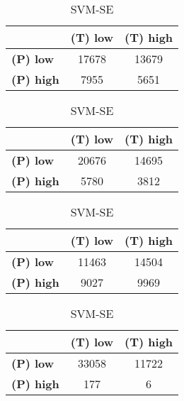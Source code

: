 \begin{landscape}
\begin{table}[htbp]
\centering
\caption{PCA_HoE__A SEX}
\begin{minipage}{.3\textwidth}
\tiny
\caption*{SVM-AP}
\begin{tabular}{|l|c|c|}
\hline
					& \textbf{(T) low}	& \textbf{(T) high}	\\ \hline
\textbf{(P) low}	& 17678				& 13679				\\ \hline
\textbf{(P) high}	& 7955				& 5651				\\ \hline
\end{tabular}
\end{minipage}\hfill
\begin{minipage}{.3\textwidth}
\tiny
\caption*{SVM-AT}
\begin{tabular}{|l|c|c|}
\hline
					& \textbf{(T) low}	& \textbf{(T) high}	\\ \hline
\textbf{(P) low}	& 20676				& 14695				\\ \hline
\textbf{(P) high}	& 5780				& 3812				\\ \hline
\end{tabular}
\end{minipage}\hfill
\begin{minipage}{.3\textwidth}
\tiny
\caption*{SVM-PL}
\begin{tabular}{|l|c|c|}
\hline
					& \textbf{(T) low}	& \textbf{(T) high}	\\ \hline
\textbf{(P) low}	& 11463				& 14504				\\ \hline
\textbf{(P) high}	& 9027				& 9969				\\ \hline
\end{tabular}
\end{minipage}\hfill
\begin{minipage}{.3\textwidth}
\tiny
\caption*{SVM-SE}
\begin{tabular}{|l|c|c|}
\hline
					& \textbf{(T) low}	& \textbf{(T) high}	\\ \hline
\textbf{(P) low}	& 33058				& 11722				\\ \hline
\textbf{(P) high}	& 177				& 6					\\ \hline
\end{tabular}
\end{minipage}\hfill
\end{table}
\begin{table}[htbp]
\centering
\begin{minipage}{.3\textwidth}

\end{minipage}
\end{table}
\end{landscape}
